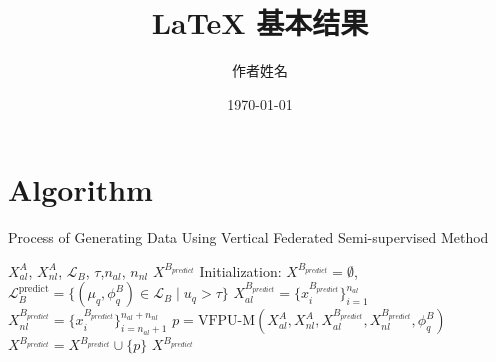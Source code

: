 \documentclass{article}  %
\begin{document}
	
	\title{LaTeX 基本结果}
	\author{作者姓名}
	\date{\today}  %
	\maketitle  %
	
	\section{Algorithm}
	
	\begin{algorithm}
		\caption{Process of Generating Data Using Vertical Federated Semi-supervised Method}
		\begin{algorithmic}[1]
			\Require $X_{al}^A$, $X_{nl}^A$, $\mathcal{L}_B$, $\tau$,$n_{al}$, $n_{nl}$
			\Ensure $X^{B_{predict}}$
			\State Initialization: $X^{B_{predict}} = \emptyset$, $\mathcal{L}_B^{\text{predict}} = \{(\mu_q, \phi^B_q) \in \mathcal{L}_B \mid u_q > \tau\}$
			\State $X_{al}^{B_{predict}}=\{x_{i}^{B_{predict}}\}_{i=1}^{n_{al}}$
			\State $X_{nl}^{B_{predict}}=\{x_{i}^{B_{predict}}\}_{i=n_{al}+1}^{n_{al}+n_{nl}}$
			\State $p = \text{VFPU-M}(X_{al}^A, X_{nl}^A, X_{al}^{B_{predict}}, X_{nl}^{B_{predict}}, \phi^B_q)$
			\State $X^{B_{predict}} = X^{B_{predict}} \cup \{p\}$
			\EndFor
			\State
			\Return $X^{B_{predict}}$
		\end{algorithmic}
	\end{algorithm}
\end{document}
